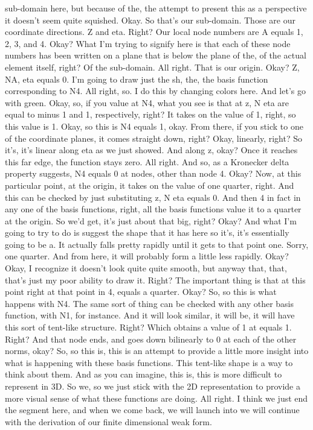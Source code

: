 \documentclass[10pt]{article}
\begin{document}
sub-domain here, but because of the, the attempt to present this as a perspective it doesn't seem quite squished. Okay. So that's our sub-domain. Those are our coordinate directions. Z and eta. Right? Our local node numbers are A equals 1, 2, 3, and 4. Okay? What I'm trying to signify here is that each of these node numbers has been written on a plane that is below the plane of the, of the actual element itself, right? Of the sub-domain. All right. That is our origin. Okay? Z, NA, eta equals 0. I'm going to draw just the sh, the, the basis function corresponding to N4. All right, so. I do this by changing colors here. And let's go with green. Okay, so, if you value at N4, what you see is that at z, N eta are equal to minus 1 and 1, respectively, right? It takes on the value of 1, right, so this value is 1. Okay, so this is N4 equals 1, okay. From there, if you stick to one of the coordinate planes, it comes straight down, right? Okay, linearly, right? So it's, it's linear along eta as we just showed. And along z, okay? Once it reaches this far edge, the function stays zero. All right. And so, as a Kronecker delta property suggests, N4 equals 0 at nodes, other than node 4. Okay? Now, at this particular point, at the origin, it takes on the value of one quarter, right. And this can be checked by just substituting z, N eta equals 0. And then 4 in fact in any one of the basis functions, right, all the basis functions value it to a quarter at the origin. So we'd get, it's just about that big, right? Okay? And what I'm going to try to do is suggest the shape that it has here so it's, it's essentially going to be a. It actually falls pretty rapidly until it gets to that point one. Sorry, one quarter. And from here, it will probably form a little less rapidly. Okay? Okay, I recognize it doesn't look quite quite smooth, but anyway that, that, that's just my poor ability to draw it. Right? The important thing is that at this point right at that point in 4, equals a quarter. Okay? So, so this is what happens with N4. The same sort of thing can be checked with any other basis function, with N1, for instance. And it will look similar, it will be, it will have this sort of tent-like structure. Right? Which obtains a value of 1 at equals 1. Right? And that node ends, and goes down bilinearly to 0 at each of the other norms, okay? So, so this is, this is an attempt to provide a little more insight into what is happening with these basis functions. This tent-like shape is a way to think about them. And as you can imagine, this is, this is more difficult to represent in 3D. So we, so we just stick with the 2D representation to provide a more visual sense of what these functions are doing. All right. I think we just end the segment here, and when we come back, we will launch into we will continue with the derivation of our finite dimensional weak form.
\end{document}
